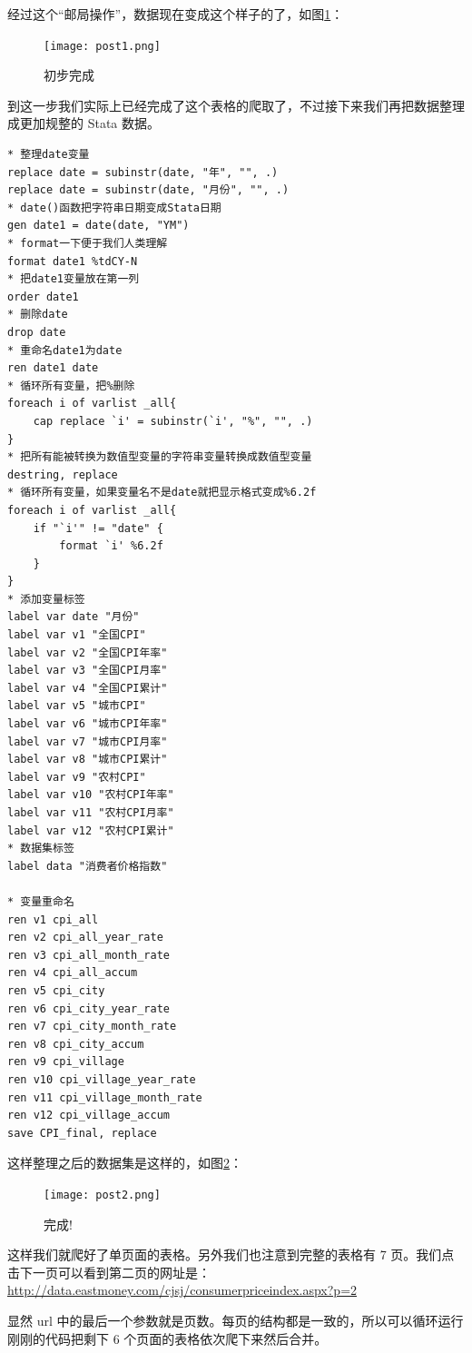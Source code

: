 \documentclass[cn,fancy,blue,11pt]{elegantbook}
\begin{document}
经过这个``邮局操作''，数据现在变成这个样子的了，如图\ref{fig:post1}：

\begin{figure}
  \centering
  \texttt{[image: post1.png]}
  \caption{初步完成}
  \label{fig:post1}
\end{figure}

到这一步我们实际上已经完成了这个表格的爬取了，不过接下来我们再把数据整理成更加规整的 Stata 数据。

\begin{lstlisting}
* 整理date变量
replace date = subinstr(date, "年", "", .)
replace date = subinstr(date, "月份", "", .)
* date()函数把字符串日期变成Stata日期
gen date1 = date(date, "YM")
* format一下便于我们人类理解
format date1 %tdCY-N
* 把date1变量放在第一列
order date1
* 删除date
drop date
* 重命名date1为date
ren date1 date
* 循环所有变量，把%删除
foreach i of varlist _all{
    cap replace `i' = subinstr(`i', "%", "", .)
}
* 把所有能被转换为数值型变量的字符串变量转换成数值型变量
destring, replace
* 循环所有变量，如果变量名不是date就把显示格式变成%6.2f
foreach i of varlist _all{
    if "`i'" != "date" {
        format `i' %6.2f
    }
}
* 添加变量标签
label var date "月份"
label var v1 "全国CPI"
label var v2 "全国CPI年率"
label var v3 "全国CPI月率"
label var v4 "全国CPI累计"
label var v5 "城市CPI"
label var v6 "城市CPI年率"
label var v7 "城市CPI月率"
label var v8 "城市CPI累计"
label var v9 "农村CPI"
label var v10 "农村CPI年率"
label var v11 "农村CPI月率"
label var v12 "农村CPI累计"
* 数据集标签
label data "消费者价格指数"

* 变量重命名
ren v1 cpi_all
ren v2 cpi_all_year_rate
ren v3 cpi_all_month_rate
ren v4 cpi_all_accum
ren v5 cpi_city
ren v6 cpi_city_year_rate
ren v7 cpi_city_month_rate
ren v8 cpi_city_accum
ren v9 cpi_village
ren v10 cpi_village_year_rate
ren v11 cpi_village_month_rate
ren v12 cpi_village_accum
save CPI_final, replace
\end{lstlisting}

这样整理之后的数据集是这样的，如图\ref{fig:post2}：

\begin{figure}
  \centering
  \texttt{[image: post2.png]}
  \caption{完成!}
  \label{fig:post2}
\end{figure}

这样我们就爬好了单页面的表格。另外我们也注意到完整的表格有 7 页。我们点击下一页可以看到第二页的网址是：\url{http://data.eastmoney.com/cjsj/consumerpriceindex.aspx?p=2}

显然 url 中的最后一个参数就是页数。每页的结构都是一致的，所以可以循环运行刚刚的代码把剩下 6 个页面的表格依次爬下来然后合并。
\end{document}
